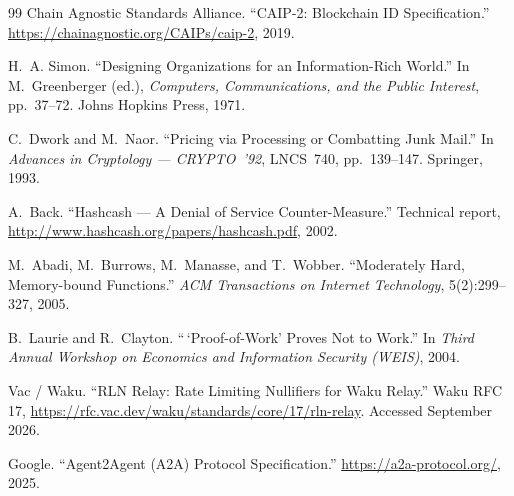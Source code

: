 \begin{thebibliography}{99}
Chain Agnostic Standards Alliance. ``CAIP-2: Blockchain ID Specification.''
\url{https://chainagnostic.org/CAIPs/caip-2}, 2019.

H.~A. Simon. ``Designing Organizations for an Information-Rich World.'' In M.~Greenberger
(ed.), \emph{Computers, Communications, and the Public Interest}, pp.~37--72. Johns
Hopkins Press, 1971.

C.~Dwork and M.~Naor. ``Pricing via Processing or Combatting Junk Mail.'' In
\emph{Advances in Cryptology --- CRYPTO~'92}, LNCS~740, pp.~139--147. Springer, 1993.

A.~Back. ``Hashcash --- A Denial of Service Counter-Measure.'' Technical report,
\url{http://www.hashcash.org/papers/hashcash.pdf}, 2002.

M.~Abadi, M.~Burrows, M.~Manasse, and T.~Wobber. ``Moderately Hard, Memory-bound
Functions.'' \emph{ACM Transactions on Internet Technology}, 5(2):299--327, 2005.

B.~Laurie and R.~Clayton. ``\,`Proof-of-Work' Proves Not to Work.'' In \emph{Third Annual
Workshop on Economics and Information Security (WEIS)}, 2004.

Vac / Waku. ``RLN Relay: Rate Limiting Nullifiers for Waku Relay.'' Waku RFC 17,
\url{https://rfc.vac.dev/waku/standards/core/17/rln-relay}. Accessed September 2026.

Google. ``Agent2Agent (A2A) Protocol Specification.''
\url{https://a2a-protocol.org/}, 2025.

\end{thebibliography}
